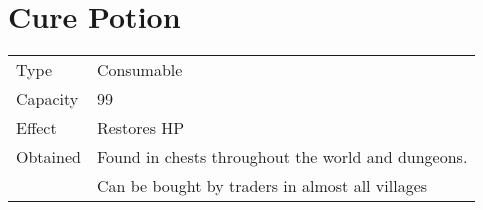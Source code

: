\section{Cure Potion}
\label{item:cure_potion}


\noindent\begin{tabularx}{\textwidth}[l]{lX}
	Type
	& Consumable
\\ %
	Capacity
	& 99
\\ %
	Effect
	& Restores HP
\\ %
	Obtained
	& Found in chests throughout the world and dungeons. \\
	& Can be bought by traders in almost all villages
\end{tabularx}
